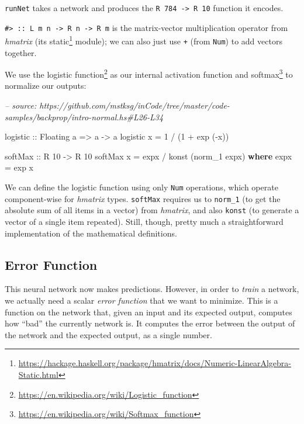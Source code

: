 \documentclass[]{article}
\newenvironment{Shaded}{}{}
\newcommand{\CommentTok}[1]{\textcolor[rgb]{0.38,0.63,0.69}{\textit{#1}}}
\newcommand{\DataTypeTok}[1]{\textcolor[rgb]{0.56,0.13,0.00}{#1}}
\newcommand{\DecValTok}[1]{\textcolor[rgb]{0.25,0.63,0.44}{#1}}
\newcommand{\FunctionTok}[1]{\textcolor[rgb]{0.02,0.16,0.49}{#1}}
\newcommand{\KeywordTok}[1]{\textcolor[rgb]{0.00,0.44,0.13}{\textbf{#1}}}
\newcommand{\NormalTok}[1]{#1}
\newcommand{\OtherTok}[1]{\textcolor[rgb]{0.00,0.44,0.13}{#1}}
\renewcommand{\href}[2]{#2\footnote{\url{#1}}}
\begin{document}
\texttt{runNet} takes a network and produces the
\texttt{R\ 784\ -\textgreater{}\ R\ 10} function it encodes.

\texttt{\#\textgreater{}\ ::\ L\ m\ n\ -\textgreater{}\ R\ n\ -\textgreater{}\ R\ m}
is the matrix-vector multiplication operator from \emph{hmatrix} (its
\href{https://hackage.haskell.org/package/hmatrix/docs/Numeric-LinearAlgebra-Static.html}{static}
module); we can also just use \texttt{+} (from \texttt{Num}) to add vectors
together.

We use the \href{https://en.wikipedia.org/wiki/Logistic_function}{logistic
function} as our internal activation function and
\href{https://en.wikipedia.org/wiki/Softmax_function}{softmax} to normalize our
outputs:

\begin{Shaded}
\begin{Highlighting}[]
\CommentTok{-- source: https://github.com/mstksg/inCode/tree/master/code-samples/backprop/intro-normal.hs#L26-L34}

\OtherTok{logistic ::} \DataTypeTok{Floating}\NormalTok{ a }\OtherTok{=>}\NormalTok{ a }\OtherTok{->}\NormalTok{ a}
\NormalTok{logistic x }\FunctionTok{=} \DecValTok{1} \FunctionTok{/}\NormalTok{ (}\DecValTok{1} \FunctionTok{+}\NormalTok{ exp (}\FunctionTok{-}\NormalTok{x))}

\NormalTok{softMax}
\OtherTok{    ::} \DataTypeTok{R} \DecValTok{10}
    \OtherTok{->} \DataTypeTok{R} \DecValTok{10}
\NormalTok{softMax x }\FunctionTok{=}\NormalTok{ expx }\FunctionTok{/}\NormalTok{ konst (norm_1 expx)}
  \KeywordTok{where}
\NormalTok{    expx }\FunctionTok{=}\NormalTok{ exp x}
\end{Highlighting}
\end{Shaded}

We can define the logistic function using only \texttt{Num} operations, which
operate component-wise for \emph{hmatrix} types. \texttt{softMax} requires us to
\texttt{norm\_1} (to get the absolute sum of all items in a vector) from
\emph{hmatrix}, and also \texttt{konst} (to generate a vector of a single item
repeated). Still, though, pretty much a straightforward implementation of the
mathematical definitions.

\hypertarget{error-function}{%
\subsection{Error Function}\label{error-function}}

This neural network now makes predictions. However, in order to \emph{train} a
network, we actually need a scalar \emph{error function} that we want to
minimize. This is a function on the network that, given an input and its
expected output, computes how ``bad'' the currently network is. It computes the
error between the output of the network and the expected output, as a single
number.
\end{document}
